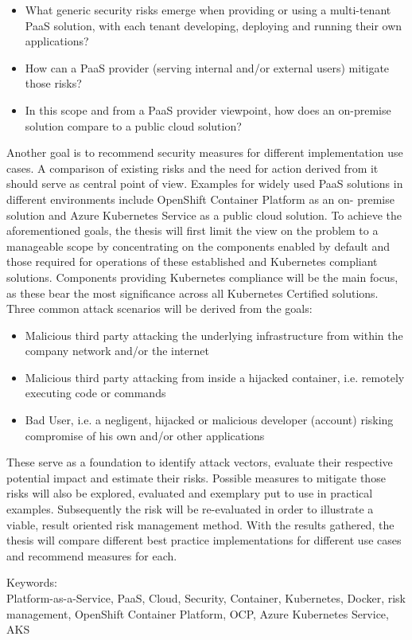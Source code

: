 \begin{itemize}

\item What generic security risks emerge when providing or using a multi-tenant PaaS solution,
with each tenant developing, deploying and running their own applications? 

\item How can a PaaS provider (serving internal and/or external users) mitigate those risks? 

\item  In this scope and from a PaaS provider viewpoint, how does an on-premise solution compare
to a public cloud solution? 

\end{itemize}

Another goal is to recommend security measures for different implementation use cases.
A comparison of existing risks and the need for action derived from it should serve as central point of view.
Examples for widely used PaaS solutions in different environments include OpenShift Container Platform 
as an on- premise solution and Azure Kubernetes Service as a public cloud solution.
To achieve the aforementioned goals, the thesis will first limit the view on the problem to a manageable scope by
concentrating on the components enabled by default and those required for operations of these established and Kubernetes compliant solutions.
Components providing Kubernetes compliance will be the main focus, as these bear the most significance across all Kubernetes Certified solutions. 
Three common attack scenarios will be derived from the goals:

\begin{itemize}

\item Malicious third party attacking the underlying infrastructure from within the company network and/or the
internet

\item Malicious third party attacking from inside a hijacked container, i.e. remotely executing code
or commands

\item Bad User, i.e. a negligent, hijacked or malicious developer (account) risking compromise of
his own and/or other applications

\end{itemize}

These serve as a foundation to identify attack vectors, evaluate their respective potential impact and estimate their risks.
Possible measures to mitigate those risks will also be explored, evaluated and exemplary put to use in practical examples.
Subsequently the risk will be re-evaluated in order to illustrate a viable, result oriented risk management method.
With the results gathered, the thesis will compare different best practice implementations for different use cases and recommend measures for each.


\bigskip

\noindent
Keywords: \\
Platform-as-a-Service, PaaS, Cloud, Security, Container, Kubernetes, Docker, risk management, OpenShift Container Platform, OCP, Azure Kubernetes Service, AKS

